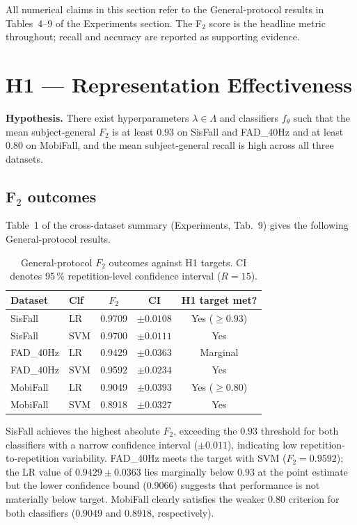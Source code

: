 \documentclass[onluarkali,ingilizce,yukseklisans,karton,LisansustuEgitim]{itutez}
\providecommand{\1}{\mathbf{1}}
\begin{document}
All numerical claims in this section refer to the General-protocol results in
Tables~4--9 of the Experiments section.  The F$_2$ score is the headline metric
throughout; recall and accuracy are reported as supporting evidence.

\section{H1 — Representation Effectiveness}
\label{subsec:H1}

\textbf{Hypothesis.} There exist hyperparameters $\lambda\in\Lambda$ and classifiers
$f_\theta$ such that the mean subject-general $F_2$ is at least $0.93$ on SisFall and
FAD\_40Hz and at least $0.80$ on MobiFall, and the mean subject-general recall is high
across all three datasets.

\subsection{F$_2$ outcomes}

Table~1 of the cross-dataset summary (Experiments, Tab.~9) gives the following
General-protocol results.

\begin{table}[h!]
\centering
\caption{General-protocol $F_2$ outcomes against H1 targets.  CI denotes
  95\,\% repetition-level confidence interval ($R=15$).}
\label{tab:H1-summary}
\small
\begin{tabular}{llccc}
\toprule
\textbf{Dataset} & \textbf{Clf} & \textbf{$F_2$} & \textbf{CI} & \textbf{H1 target met?} \\
\midrule
SisFall   & LR  & 0.9709 & $\pm0.0108$ & Yes ($\geq0.93$) \\
SisFall   & SVM & 0.9700 & $\pm0.0111$ & Yes              \\
FAD\_40Hz & LR  & 0.9429 & $\pm0.0363$ & Marginal         \\
FAD\_40Hz & SVM & 0.9592 & $\pm0.0234$ & Yes              \\
MobiFall  & LR  & 0.9049 & $\pm0.0393$ & Yes ($\geq0.80$) \\
MobiFall  & SVM & 0.8918 & $\pm0.0327$ & Yes              \\
\bottomrule
\end{tabular}
\end{table}

SisFall achieves the highest absolute $F_2$, exceeding the $0.93$ threshold for both
classifiers with a narrow confidence interval ($\pm0.011$), indicating low
repetition-to-repetition variability.  FAD\_40Hz meets the target with SVM ($F_2 =
0.9592$); the LR value of $0.9429\pm0.0363$ lies marginally below $0.93$ at the point
estimate but the lower confidence bound ($0.9066$) suggests that performance is not
materially below target.  MobiFall clearly satisfies the weaker $0.80$ criterion for
both classifiers ($0.9049$ and $0.8918$, respectively).
\end{document}
